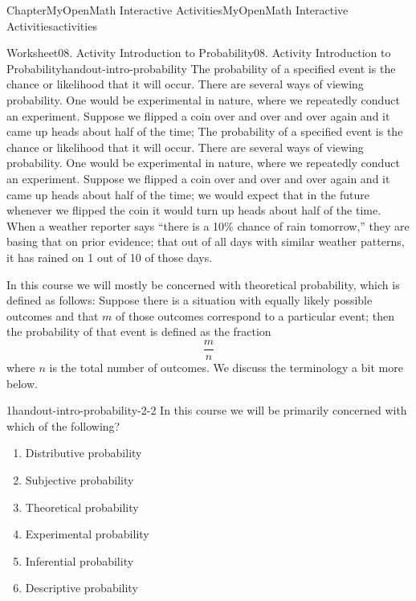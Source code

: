 \documentclass[oneside,10pt,]{book}
\begin{document}
\begin{chapterptx}{Chapter}{MyOpenMath Interactive Activities}{}{MyOpenMath Interactive Activities}{}{}{activities}
\typeout{************************************************}
%
\begin{worksheet-section}{Worksheet}{08. Activity Introduction to Probability}{}{08. Activity Introduction to Probability}{}{}{handout-intro-probability}
The probability of a specified event is the chance or likelihood that it will occur. There are several ways of viewing probability. One would be experimental in nature, where we repeatedly conduct an experiment. Suppose we flipped a coin over and over and over again and it came up heads about half of the time; The probability of a specified event is the chance or likelihood that it will occur. There are several ways of viewing probability. One would be experimental in nature, where we repeatedly conduct an experiment. Suppose we flipped a coin over and over and over again and it came up heads about half of the time; we would expect that in the future whenever we flipped the coin it would turn up heads about half of the time. When a weather reporter says \textquotedblleft{}there is a 10\% chance of rain tomorrow,\textquotedblright{} they are basing that on prior evidence; that out of all days with similar weather patterns, it has rained on 1 out of 10 of those days.%
 \par
In this course we will mostly be concerned with theoretical probability, which is defined as follows: Suppose there is a situation with equally likely possible outcomes and that \(m\) of those outcomes correspond to a particular event; then the probability of that event is defined as the fraction%
\begin{equation*}
\frac{m}{n}
\end{equation*}
where \(n\) is the total number of outcomes. We discuss the terminology a bit more below.%
\begin{divisionexercise}{1}{}{}{handout-intro-probability-2-2}%
In this course we will be primarily concerned with which of the following?%
\par
%
\begin{enumerate}[label={(\alph*)}]
\item{}Distributive probability%
\item{}Subjective probability%
\item{}Theoretical probability%
\item{}Experimental probability%
\item{}Inferential probability%
\item{}Descriptive probability%

\end{enumerate}
\end{divisionexercise}
\end{worksheet-section}
\end{chapterptx}
\end{document}
